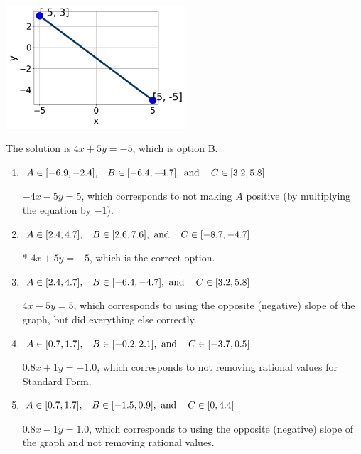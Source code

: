 \documentclass{extbook}[14pt]
\begin{document}
\begin{enumerate}
{\begin{center}
    \includegraphics[width=0.5\textwidth]{../Figures/linearGraphToStandardB.png}
\end{center}



The solution is \( 4x + 5y = -5 \), which is option B.\begin{enumerate}[label=\Alph*.]
\item \( A \in [-6.9, -2.4], \hspace{3mm} B \in [-6.4, -4.7], \text{ and } \hspace{3mm} C \in [3.2, 5.8] \)

 $-4x - 5y = 5$, which corresponds to not making $A$ positive (by multiplying the equation by $-1$).
\item \( A \in [2.4, 4.7], \hspace{3mm} B \in [2.6, 7.6], \text{ and } \hspace{3mm} C \in [-8.7, -4.7] \)

* $4x + 5y = -5$, which is the correct option.
\item \( A \in [2.4, 4.7], \hspace{3mm} B \in [-6.4, -4.7], \text{ and } \hspace{3mm} C \in [3.2, 5.8] \)

 $4x - 5y = 5$, which corresponds to using the opposite (negative) slope of the graph, but did everything else correctly.
\item \( A \in [0.7, 1.7], \hspace{3mm} B \in [-0.2, 2.1], \text{ and } \hspace{3mm} C \in [-3.7, 0.5] \)

 $0.8x + 1y = -1.0$, which corresponds to not removing rational values for Standard Form.
\item \( A \in [0.7, 1.7], \hspace{3mm} B \in [-1.5, 0.9], \text{ and } \hspace{3mm} C \in [0, 4.4] \)

 $0.8x - 1y = 1.0$, which corresponds to using the opposite (negative) slope of the graph and not removing rational values.
\end{enumerate}

}
\end{enumerate}
\end{document}
